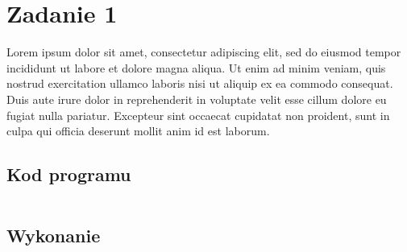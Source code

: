 \section{Zadanie 1}
\begin{large}
    Lorem ipsum dolor sit amet, consectetur adipiscing elit, sed do eiusmod tempor incididunt ut labore et dolore magna aliqua. Ut enim ad minim veniam, quis nostrud exercitation ullamco laboris nisi ut aliquip ex ea commodo consequat. Duis aute irure dolor in reprehenderit in voluptate velit esse cillum dolore eu fugiat nulla pariatur. Excepteur sint occaecat cupidatat non proident, sunt in culpa qui officia deserunt mollit anim id est laborum.
\end{large}
\subsection{Kod programu}
\begin{Large}
    \inputminted[linenos]{java}{code/HelloWorld.java}
\end{Large}
\subsection{Wykonanie}
\begin{Large}
    \inputminted{shell}{code/out/HelloWorld.out}
\end{Large}
